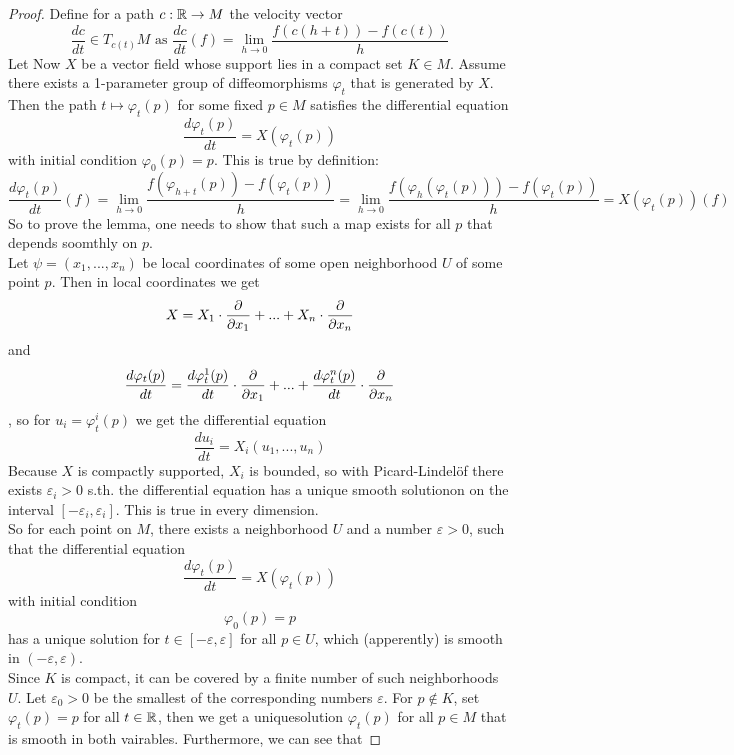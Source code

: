 \begin{proof}
   Define for a path $c: {\mathbb R} \rightarrow M$ the velocity vector 
   \[ \frac{dc}{dt} \in T_{c(t)}M \text{ as } \frac{dc}{dt}(f) = 
   \lim_{h \to 0} \frac{f(c(h + t)) - f(c(t))}{h}\]
   Let Now $X$ be a vector field whose support lies in a compact set $K \in M$. 
   Assume there exists a 1-parameter group of diffeomorphisms $\varphi_t$ that 
   is generated by $X$. Then the path $t \mapsto \varphi_t(p)$ for some fixed 
   $p \in M$ satisfies the differential equation
   \[ \frac{d\varphi_t(p)}{dt} = X(\varphi_t(p)) \]
   with initial condition $\varphi_0(p) = p$. This is true by definition:
   \[ \frac{d\varphi_t(p)}{dt}(f) 
   = \lim_{h \to 0} \frac{f(\varphi_{h + t}(p)) - f(\varphi_t(p))}{h} 
   = \lim_{h \to 0} \frac{f(\varphi_{h}(\varphi_t(p))) - f(\varphi_t(p))}{h} 
   = X(\varphi_t(p))(f) \]
   So to prove the lemma, one needs to show that such a map exists for all $p$ 
   that depends soomthly on $p$. \\
   Let $\psi = (x_1, ..., x_n)$ be local coordinates of some open neighborhood 
   $U$ of some point $p$. Then in local coordinates we get
   \[ X = X_1 \cdot \frac{\partial  }{\partial x_1} + ... + X_n \cdot \frac{\partial  }{\partial x_n} \]
   and 
   \[ \frac{d\varphi_t(p)}{dt} 
   = \frac{d\varphi_t^1(p)}{dt} \cdot \frac{\partial  }{\partial x_1} + ... + \frac{d\varphi_t^n(p)}{dt} \cdot \frac{\partial  }{\partial x_n}\]
   , so for $u_i = \varphi_t^i(p)$ we get the differential equation 
   \[ \frac{du_i}{dt} = X_i(u_1, ..., u_n) \]
   Because $X$ is compactly supported, $X_i$ is bounded, so with
   Picard-Lindelöf there exists $\varepsilon_i > 0$ s.th. the differential equation
   has a unique smooth solutionon on the interval $[-\varepsilon_i, \varepsilon_i]$. 
   This is true in every dimension. \\
   So for each point on $M$, there exists a neighborhood $U$ and a number 
   $\varepsilon > 0$, such that the differential equation
   \[ \frac{d\varphi_t(p)}{dt} = X(\varphi_t(p)) \]
   with initial condition 
   \[ \varphi_0(p) = p \]
   has a unique solution for $t \in [-\varepsilon, \varepsilon]$ for all 
   $p \in U$, which (apperently) is smooth in $(-\varepsilon, \varepsilon)$. \\
   Since $K$ is compact, it can be covered by a finite number of such 
   neighborhoods $U$. Let $\varepsilon_0 > 0$ be the smallest of the 
   corresponding numbers $\varepsilon$. For $p \notin K$, set $\varphi_t(p) = p$
   for all $t \in {\mathbb R}$, then we get a uniquesolution $\varphi_t(p)$ for all 
   $p \in M$ that is smooth in both vairables. Furthermore, we can see that 

\end{proof}
